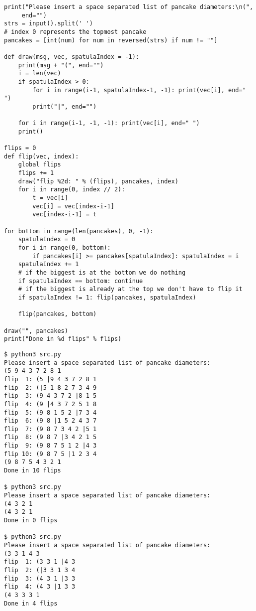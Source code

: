 \documentclass[11pt]{article}
\begin{document}
\begin{verbatim}
print("Please insert a space separated list of pancake diameters:\n(",
     end="")
strs = input().split(' ')
# index 0 represents the topmost pancake
pancakes = [int(num) for num in reversed(strs) if num != ""]

def draw(msg, vec, spatulaIndex = -1):
    print(msg + "(", end="")
    i = len(vec)
    if spatulaIndex > 0: 
        for i in range(i-1, spatulaIndex-1, -1): print(vec[i], end=" ")
        print("|", end="")

    for i in range(i-1, -1, -1): print(vec[i], end=" ")
    print()

flips = 0
def flip(vec, index):
    global flips
    flips += 1
    draw("flip %2d: " % (flips), pancakes, index)
    for i in range(0, index // 2):
        t = vec[i]
        vec[i] = vec[index-i-1]
        vec[index-i-1] = t

for bottom in range(len(pancakes), 0, -1):
    spatulaIndex = 0
    for i in range(0, bottom):
        if pancakes[i] >= pancakes[spatulaIndex]: spatulaIndex = i
    spatulaIndex += 1
    # if the biggest is at the bottom we do nothing
    if spatulaIndex == bottom: continue
    # if the biggest is already at the top we don't have to flip it
    if spatulaIndex != 1: flip(pancakes, spatulaIndex)

    flip(pancakes, bottom)

draw("", pancakes)
print("Done in %d flips" % flips)
\end{verbatim}

\begin{verbatim}
$ python3 src.py
Please insert a space separated list of pancake diameters:
(5 9 4 3 7 2 8 1
flip  1: (5 |9 4 3 7 2 8 1 
flip  2: (|5 1 8 2 7 3 4 9 
flip  3: (9 4 3 7 2 |8 1 5 
flip  4: (9 |4 3 7 2 5 1 8 
flip  5: (9 8 1 5 2 |7 3 4 
flip  6: (9 8 |1 5 2 4 3 7 
flip  7: (9 8 7 3 4 2 |5 1 
flip  8: (9 8 7 |3 4 2 1 5 
flip  9: (9 8 7 5 1 2 |4 3 
flip 10: (9 8 7 5 |1 2 3 4 
(9 8 7 5 4 3 2 1 
Done in 10 flips

$ python3 src.py
Please insert a space separated list of pancake diameters:
(4 3 2 1
(4 3 2 1 
Done in 0 flips

$ python3 src.py
Please insert a space separated list of pancake diameters:
(3 3 1 4 3
flip  1: (3 3 1 |4 3 
flip  2: (|3 3 1 3 4 
flip  3: (4 3 1 |3 3 
flip  4: (4 3 |1 3 3 
(4 3 3 3 1 
Done in 4 flips
\end{verbatim}
\end{document}
